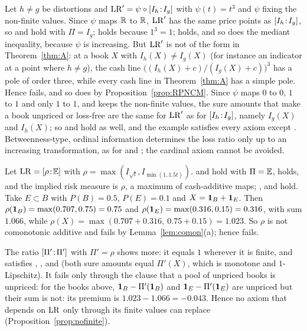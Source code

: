 \begin{example}\label{ex:cube}
Let $h\ne g$ be distortions and $\mathrm{LR}'=\psi\circ[I_h\!:\!I_g]$ with $\psi(t)=t^3$ and $\psi$ fixing the
non-finite values. Since $\psi$ maps $\mathbb R$ to $\mathbb R$, $\mathrm{LR}'$ has the same price points as $[I_h\!:\!I_g]$, so
\axPe{} and \axP{} hold with $\Pi=I_g$; \axN{} holds because $1^3=1$; \axLI{} holds, and so does the mediant inequality,
because $\psi$ is increasing. But $\mathrm{LR}'$ is not of the form in Theorem~\ref{thm:A}: at a book $X$ with
$I_h(X)\neq I_g(X)$ (for instance an indicator at a point where $h\ne g$), the cash line
$\big((I_h(X)+c)/(I_g(X)+c)\big)^3$ has a pole of order three, while every cash line in Theorem~\ref{thm:A} has a
simple pole. Hence \axCM{} fails, and so does \axR{} by Proposition~\ref{prop:RPNCM}. Since $\psi$ maps $0$ to $0$, $1$
to $1$ and only $1$ to $1$, and keeps the non-finite values, the sure amounts that make a book unpriced or loss-free
are the same for $\mathrm{LR}'$ as for $[I_h\!:\!I_g]$, namely $I_g(X)$ and $I_h(X)$; so \axRC{} and \axRM{} hold as well,
and the example satisfies every axiom except \axR. Betweenness-type, ordinal information determines the loss ratio only up to an
increasing transformation, as for \citet{chew1983} and \citet{dekel1986}; the cardinal axiom \axR{} cannot be
avoided.
\end{example}

\begin{example}\label{ex:indepR}
Let $\mathrm{LR}=[\rho\!:\!\mathbb E]$ with $\rho=\max(I_{\sqrt t},I_{\min(1,1.5t)})$. \axPe{} and \axP{} hold with $\Pi=\mathbb E$, \axN{}
holds, and the implied risk measure is $\rho$, a maximum of cash-additive maps; \axLI, \axRM{} and \axRC{} hold. Take
$E\subset B$ with $P(B)=0.5$, $P(E)=0.1$ and $X=\mathbf 1_B+\mathbf 1_E$. Then $\rho(\mathbf 1_B)=\max(0.707,0.75)=0.75$ and
$\rho(\mathbf 1_E)=\max(0.316,0.15)=0.316$, with sum $1.066$, while $\rho(X)=\max(0.707+0.316,\ 0.75+0.15)=1.023$. So $\rho$
is not comonotonic additive and \axCM{} fails by Lemma~\ref{lem:comon}(a); hence \axR{} fails.

The ratio $[\Pi'\!:\!\Pi']$ with $\Pi'=\rho$ shows more: it equals $1$ wherever it is finite, and satisfies
\axPe, \axLI, \axRC{} and \axRM{} (both sure amounts equal $\Pi'(X)$, which is monotone and $1$-Lipschitz). It fails
\axR{} only through the clause that a pool of unpriced books is unpriced: for the books above, $\mathbf 1_B-\Pi'(\mathbf 1_B)$ and
$\mathbf 1_E-\Pi'(\mathbf 1_E)$ are unpriced but their sum is not: its premium is $1.023-1.066=-0.043$. Hence no axiom that
depends on $\mathrm{LR}$ only through its finite values can replace \axR{} (Proposition~\ref{prop:nofinite}).
\end{example}

